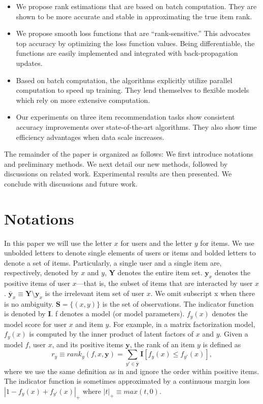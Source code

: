 \documentclass[letterpaper]{article}
\begin{document}
\begin{itemize}
\item We propose rank estimations that are based on batch computation. They are shown to be more accurate and stable in approximating the true item rank.
\item We propose smooth loss functions that are ``rank-sensitive.'' This advocates top accuracy by optimizing the loss function values. Being differentiable, the functions are easily implemented and integrated with back-propagation updates.
\item Based on batch computation, the algorithms explicitly utilize parallel computation to speed up training. They lend themselves to flexible models which rely on more extensive computation.
\item Our experiments on three item recommendation tasks show consistent accuracy improvements over state-of-the-art algorithms. They also show time efficiency advantages when data scale increases.
\end{itemize}

The remainder of the paper is organized as follows: We first introduce notations and preliminary methods. We next detail our new methods, followed by discussions on related work. Experimental results are then presented. We conclude with discussions and future work.

\section{Notations}
\label{sec:notation}

In this paper we will use the letter $x$ for users and the letter $y$ for items. We use unbolded letters to denote single elements of users or items and bolded letters to denote a set of items. Particularly, a single user and a single item are, respectively, denoted by $x$ and $y$, \textbf{Y} denotes the entire item set. $\textbf{y}_x$ denotes the positive items of user $x$---that is, the subset of items that are interacted by user $x$. $\bar{\textbf{y}}_x\equiv\textbf{Y} \setminus \textbf{y}_x$ is the irrelevant item set of user $x$. We omit subscript x when there is no ambiguity. $\textbf{S}=\{(x,y)\}$ is the set of observations. The indicator function is denoted by \textbf{I}. f denotes a model (or model parameters).  $f_y(x)$ denotes the model score for user $x$ and item $y$. For example, in a matrix factorization model, $f_y(x)$ is computed by the inner product of latent factors of $x$ and $y$. Given a model $f$, user $x$, and its positive items $\textbf{y}$, the rank of an item $y$ is defined as
\begin{equation}
\label{eq:rank}
r_y\equiv rank_y(f,x,\textbf{y}) =\sum_{y'\in\bar{\textbf{y}}} \textbf{I}[f_y(x) \le f_{y'}(x)],
\end{equation}
where we use the same definition as in \cite{usunier2009ranking} and ignore the order within positive items. The indicator function is sometimes approximated by a continuous margin loss $|1-f_y(x) + f_{y'}(x)|_+$ where $|t|_+ \equiv max(t,0)$.
\end{document}

